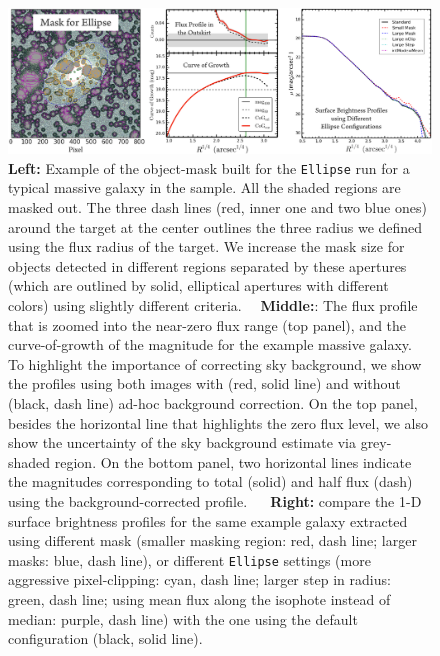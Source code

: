 \documentclass{emulateapj}
\begin{document}
\begin{CJK*}{UTF8}{gbsn}
    \begin{figure}[hbt!]
        \centering 
        \includegraphics[width=\textwidth]{fig/redbcg_ellipse_tech}
        \caption{
            \textbf{Left:} Example of the object-mask built for the \texttt{Ellipse}
            run for a typical massive galaxy in the sample. 
            All the shaded regions are masked out. 
            The three dash lines (red, inner one and two blue ones) around the target 
            at the center outlines the three radius we defined using the flux radius 
            of the target.  
            We increase the mask size for objects detected in different regions 
            separated by these apertures (which are outlined by solid, elliptical 
            apertures with different colors) using slightly different criteria.~~
            \textbf{Middle:}: The flux profile that is zoomed into the near-zero flux 
            range (top panel), and the curve-of-growth of the magnitude for the example
            massive galaxy.  
            To highlight the importance of correcting sky background, we show the profiles 
            using both images with (red, solid line) and without (black, dash line) 
            ad-hoc background correction. 
            On the top panel, besides the horizontal line that highlights the zero flux 
            level, we also show the uncertainty of the sky background estimate via 
            grey-shaded region.  
            On the bottom panel, two horizontal lines indicate the magnitudes 
            corresponding to total (solid) and half flux (dash) using the 
            background-corrected profile. ~~
            \textbf{Right:} compare the 1-D surface brightness profiles for the same 
            example galaxy extracted using different mask 
            (smaller masking region: red, dash line; larger masks: blue, dash line), 
            or different \texttt{Ellipse} settings
            (more aggressive pixel-clipping: cyan, dash line; 
             larger step in radius: green, dash line; 
             using mean flux along the isophote instead of median: purple, dash line)
            with the one using the default configuration (black, solid line).
            }
        \label{fig:ell_tech}
    \end{figure}


\end{CJK*}
\end{document}
